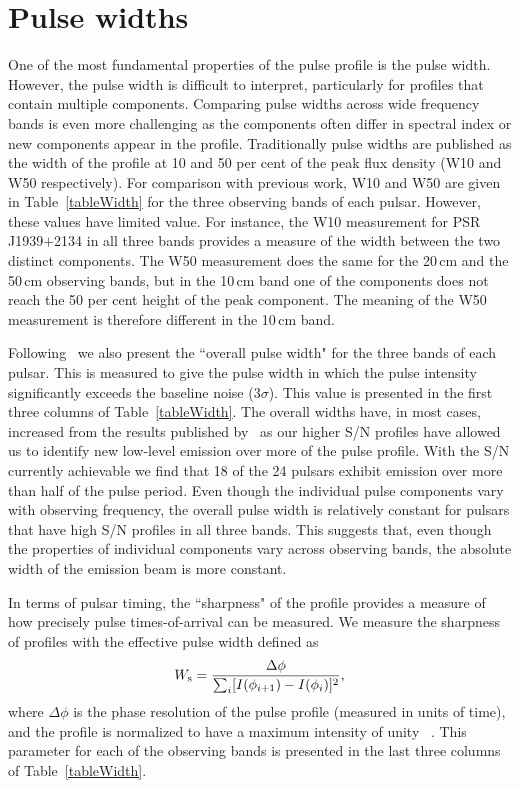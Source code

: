 \documentclass[useAMS,usenatbib]{mn2e}
\begin{document}
\section{Pulse widths}

One of the most fundamental properties of the pulse profile is the pulse width. 
However, the pulse width is difficult to interpret, particularly for profiles 
that contain multiple components. Comparing pulse widths across wide frequency 
bands is even more challenging as the components often differ in spectral index or new 
components appear in the profile. Traditionally pulse widths are published as the 
width of the profile at 10 and 50 per cent of the peak flux density (W10 and W50 
respectively).  
%
For comparison with previous work, W10 and W50 are given in Table~\ref{tableWidth} 
for the three observing bands of each pulsar. 
%
However, these values have limited value. For instance, the W10 measurement for 
PSR J1939$+$2134 in all three bands provides a measure of the width between the 
two distinct components. The W50 measurement does the same for the 20\,cm and the 
50\,cm observing bands, but in the 10\,cm band one of the components does not reach 
the 50 per cent height of the peak component. The meaning of the W50 measurement 
is therefore different in the 10\,cm band. 
%

Following~\citet{Yan11} we also present the ``overall pulse width" for the three 
bands of each pulsar. This is measured to give the pulse width in which the pulse 
intensity significantly exceeds the baseline noise (3$\sigma$). This value is presented 
in the first three columns of Table~\ref{tableWidth}.   
%
The overall widths have, in most cases, increased from the results published by~\citet{Yan11} 
as our higher S/N profiles have allowed us to identify new low-level emission over 
more of the pulse profile. With the S/N currently achievable we find that 18 of 
the 24 pulsars exhibit emission over more than half of the pulse period. 
%
Even though the individual pulse components vary with observing frequency, the 
overall pulse width is relatively constant for pulsars that have high S/N profiles in all 
three bands. This suggests that, even though the properties of individual components 
vary across observing bands, the absolute width of the emission beam is more constant.
%

In terms of pulsar timing, the ``sharpness" of the profile provides a measure of 
how precisely pulse times-of-arrival can be measured. We measure the sharpness of 
profiles with the effective pulse width defined as 
%
\begin{equation}
W_{\rm{s}}=\frac{\Delta \phi}{\sum_{i}[I(\phi_{i+1})-I(\phi_{i})]^2},
\end{equation}
%
where $\Delta \phi$ is the phase resolution of the pulse profile (measured in units 
of time), and the profile is normalized to have a maximum intensity of unity
~\citep{Cordes10,Shannon14}.
%
This parameter for each of the observing bands is presented in the last three columns 
of Table~\ref{tableWidth}.  
\end{document}

